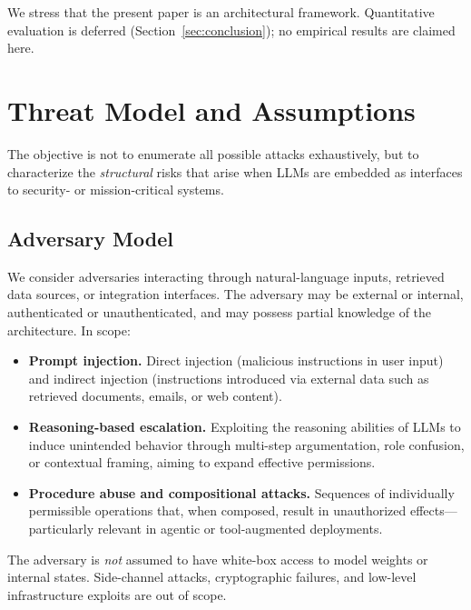 \documentclass[conference]{IEEEtran}
\begin{document}
We stress that the present paper is an architectural framework.
Quantitative evaluation is deferred (Section~\ref{sec:conclusion}); no
empirical results are claimed here.

\section{Threat Model and Assumptions}
\label{sec:threat-model}

The objective is not to enumerate all possible attacks exhaustively, but
to characterize the \emph{structural} risks that arise when LLMs are
embedded as interfaces to security- or mission-critical systems.

\subsection{Adversary Model}
We consider adversaries interacting through natural-language inputs,
retrieved data sources, or integration interfaces. The adversary may be
external or internal, authenticated or unauthenticated, and may possess
partial knowledge of the architecture. In scope:
\begin{itemize}
\item \textbf{Prompt injection.} Direct injection (malicious instructions
in user input) and indirect injection (instructions introduced via
external data such as retrieved documents, emails, or web content).
\item \textbf{Reasoning-based escalation.} Exploiting the reasoning
abilities of LLMs to induce unintended behavior through multi-step
argumentation, role confusion, or contextual framing, aiming to expand
effective permissions.
\item \textbf{Procedure abuse and compositional attacks.} Sequences of
individually permissible operations that, when composed, result in
unauthorized effects---particularly relevant in agentic or tool-augmented
deployments.
\end{itemize}
The adversary is \emph{not} assumed to have white-box access to model
weights or internal states. Side-channel attacks, cryptographic failures,
and low-level infrastructure exploits are out of scope.
\end{document}
